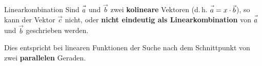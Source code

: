 \begin{bemerkung}{Linearkombination}{}
  Sind $\vec{a\vphantom{b}}$ und $\vec{b}$ zwei \textbf{kolineare} Vektoren
  (d.\,h. $\vec{a\vphantom{b}} = x\cdot{}\vec{b}$), so kann der Vektor $\vec{c}$
  nicht, oder \textbf{nicht eindeutig als Linearkombination} von $\vec{a\vphantom{b}}$ und
  $\vec{b}$ geschrieben werden.

  Dies entspricht bei linearen Funktionen der Suche nach dem
  Schnittpunkt von zwei \textbf{parallelen} Geraden.
  \end{bemerkung}

\newpage
